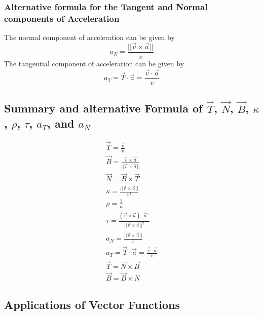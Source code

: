 \documentclass[14pt]{article}
\begin{document}
    \subsubsection{Alternative formula for the Tangent and Normal components of Acceleration}
    The normal component of acceleration can be given by
    $$a_N=\frac{||\vec v\times \vec a||}{v}$$ The tangential component
    of acceleration can be given by
    $$a_T=\vec T\cdot\vec a =\frac{\vec v\cdot \vec a}{v}$$
    \subsection{Summary and alternative Formula of $\vec T$, $\vec N$, $\vec B$, $\kappa$, $\rho$, $\tau$, $a_T$, and $a_N$}
    \begin{align}
        \vec T=\frac{\vec v}{v}\\
        \vec B=\frac{\vec v\times\vec a}{||\vec v\times \vec a||}\\
        \vec N=\vec B\times \vec T\\
        \kappa=\frac{||\vec v\times \vec a||}{v^3}\\
        \rho=\frac{1}{\kappa}\\
        \tau=\frac{(\vec v\times \vec a)\cdot\vec a\, '}{||\vec v\times \vec a||^2}\\
        a_N=\frac{||\vec v\times \vec a||}{v}\\
        a_T=\vec T\cdot\vec a =\frac{\vec v\cdot \vec a}{v}\\
        \vec T=\vec N\times\vec B\\
        \vec B=\vec B\times N
    \end{align}
    \subsection{Applications of Vector Functions}
\end{document}
